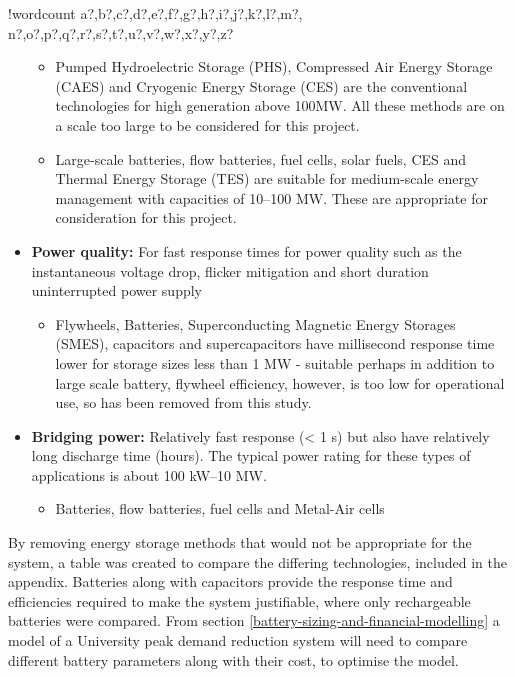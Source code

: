 \documentclass[10pt]{article}
\providecommand{\tightlist}{%
  \setlength{\itemsep}{0pt}\setlength{\parskip}{0pt}}
\newcounter{words}
\newenvironment{counted}{%
  \setcounter{words}{0}
  \SearchList!{wordcount}{\stepcounter{words}}
    {a?,b?,c?,d?,e?,f?,g?,h?,i?,j?,k?,l?,m?,
    n?,o?,p?,q?,r?,s?,t?,u?,v?,w?,x?,y?,z?}
  \UndoBoundary{'}
  \SearchOrder{p;}}{%
  \StopSearching}
\begin{document}
\begin{counted}
\begin{itemize}
  \begin{itemize}
  \tightlist
  \item
    Pumped Hydroelectric Storage (PHS), Compressed Air Energy Storage
    (CAES) and Cryogenic Energy Storage (CES) are the conventional
    technologies for high generation above 100MW. All these methods are
    on a scale too large to be considered for this project.
  \item
    Large-scale batteries, flow batteries, fuel cells, solar fuels, CES
    and Thermal Energy Storage (TES) are suitable for medium-scale
    energy management with capacities of 10--100 MW. These are
    appropriate for consideration for this project.
  \end{itemize}
\item
  \textbf{Power quality:} For fast response times for power quality such
  as the instantaneous voltage drop, flicker mitigation and short
  duration uninterrupted power supply

  \begin{itemize}
  \tightlist
  \item
    Flywheels, Batteries, Superconducting Magnetic Energy Storages
    (SMES), capacitors and supercapacitors have millisecond response
    time lower for storage sizes less than 1 MW - suitable perhaps in
    addition to large scale battery, flywheel efficiency, however, is
    too low for operational use, so has been removed from this study.
  \end{itemize}
\item
  \textbf{Bridging power:} Relatively fast response (\textless{} 1 s)
  but also have relatively long discharge time (hours). The typical
  power rating for these types of applications is about 100 kW--10 MW.

  \begin{itemize}
  \tightlist
  \item
    Batteries, flow batteries, fuel cells and Metal-Air cells
    \cite{Chen2009291}
  \end{itemize}
\end{itemize}

By removing energy storage methods that would not be appropriate for the
system, a table was created to compare the differing technologies,
included in the appendix. Batteries along with capacitors provide the
response time and efficiencies required to make the system justifiable,
where only rechargeable batteries were compared. From section
\ref{battery-sizing-and-financial-modelling} a model of a University
peak demand reduction system will need to compare different battery
parameters along with their cost, to optimise the model.


\end{counted}
\end{document}
